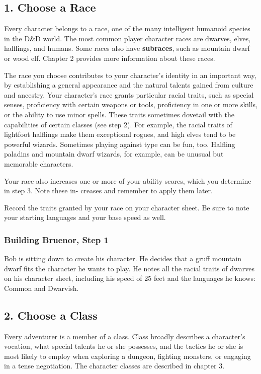 \subsection{1. Choose a Race}
Every character belongs to a race, one of the many intelligent humanoid species in the D\&D world. The most common player character races are dwarves, elves, halflings, and humans. Some races also have \textbf{subraces}, such as mountain dwarf or wood elf. Chapter 2 provides more information about these races.

The race you choose contributes to your character’s identity in an important way, by establishing a general appearance and the natural talents gained from culture and ancestry. Your character’s race grants particular racial traits, such as special senses, proficiency with certain weapons or tools, proficiency in one or more skills, or the ability to use minor spells. These traits sometimes dovetail with the capabilities of certain classes (see step 2). For example, the racial traits of lightfoot halflings make them exceptional rogues, and high elves tend to be powerful wizards. Sometimes playing against type can be fun, too. Halfling paladins and mountain dwarf wizards, for example, can be unusual but memorable characters.

Your race also increases one or more of your ability scores, which you determine in step 3. Note these in- creases and remember to apply them later.

Record the traits granted by your race on your character sheet. Be sure to note your starting languages and your base speed as well.

\subsubsection{Building Bruenor, Step 1}
Bob is sitting down to create his character. He decides that a gruff mountain dwarf fits the character he wants to play. He notes all the racial traits of dwarves on his character sheet, including his speed of 25 feet and the languages he knows: Common and Dwarvish.

\subsection{2. Choose a Class}
Every adventurer is a member of a class. Class broadly describes a character’s vocation, what special talents he or she possesses, and the tactics he or she is most likely to employ when exploring a dungeon, fighting monsters, or engaging in a tense negotiation. The character classes are described in chapter 3.


